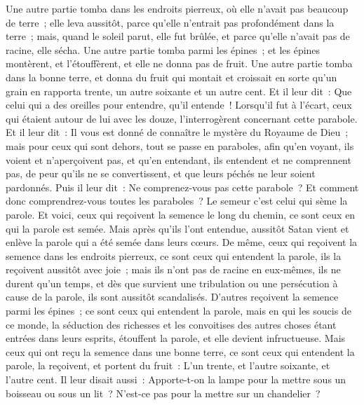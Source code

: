 \begin{multicols}{2}
Une autre partie tomba dans les endroits pierreux, où elle n'avait pas beaucoup de terre~; elle leva aussitôt, parce qu'elle n'entrait pas profondément dans la terre~;
mais, quand le soleil parut, elle fut brûlée, et parce qu'elle n'avait pas de racine, elle sécha.
Une autre partie tomba parmi les épines~; et les épines montèrent, et l'étouffèrent, et elle ne donna pas de fruit.
Une autre partie tomba dans la bonne terre, et donna du fruit qui montait et croissait en sorte qu'un grain en rapporta trente, un autre soixante et un autre cent.
Et il leur dit~: Que celui qui a des oreilles pour entendre, qu'il entende~!
Lorsqu'il fut à l'écart, ceux qui étaient autour de lui avec les douze, l'interrogèrent concernant cette parabole.
Et il leur dit~: Il vous est donné de connaître le mystère du Royaume de Dieu~; mais pour ceux qui sont dehors, tout se passe en paraboles,
afin qu'en voyant, ils voient et n'aperçoivent pas, et qu'en entendant, ils entendent et ne comprennent pas, de peur qu'ils ne se convertissent, et que leurs péchés ne leur soient pardonnés.
Puis il leur dit~: Ne comprenez-vous pas cette parabole~? Et comment donc comprendrez-vous toutes les paraboles~?
Le semeur c'est celui qui sème la parole.
Et voici, ceux qui reçoivent la semence le long du chemin, ce sont ceux en qui la parole est semée. Mais après qu'ils l'ont entendue, aussitôt Satan vient et enlève la parole qui a été semée dans leurs cœurs.
De même, ceux qui reçoivent la semence dans les endroits pierreux, ce sont ceux qui entendent la parole, ils la reçoivent aussitôt avec joie~;
mais ils n'ont pas de racine en eux-mêmes, ils ne durent qu'un temps, et dès que survient une tribulation ou une persécution à cause de la parole, ils sont aussitôt scandalisés.
D'autres reçoivent la semence parmi les épines~; ce sont ceux qui entendent la parole,
mais en qui les soucis de ce monde, la séduction des richesses et les convoitises des autres choses étant entrées dans leurs esprits, étouffent la parole, et elle devient infructueuse.
Mais ceux qui ont reçu la semence dans une bonne terre, ce sont ceux qui entendent la parole, la reçoivent, et portent du fruit~: L'un trente, et l'autre soixante, et l'autre cent.
Il leur disait aussi~: Apporte-t-on la lampe pour la mettre sous un boisseau ou sous un lit~? N'est-ce pas pour la mettre sur un chandelier~?

\end{multicols}
